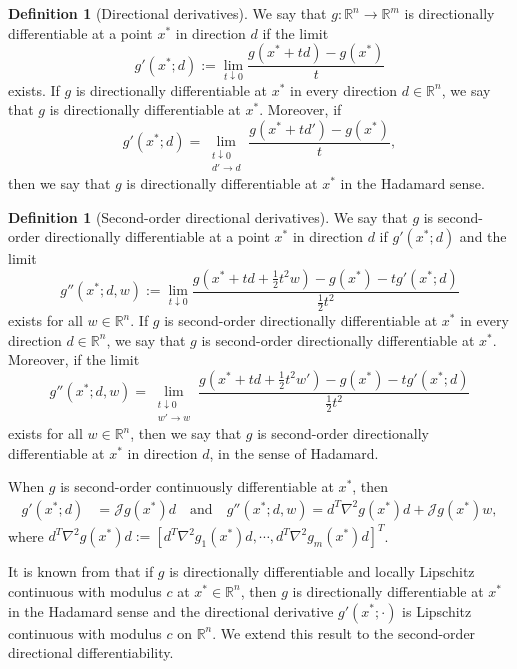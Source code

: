 \documentclass[11pt]{article}
\theoremstyle{definition}
\newtheorem{definition}[theorem]{Definition}
\theoremstyle{remark}
\numberwithin{equation}{section}
\begin{document}
\begin{definition}[Directional derivatives]
   We say that $g:\mathbb{R}^n\to \mathbb{R}^m$ is directionally differentiable at a point $x^*$ in
direction $d$ if the limit
$$g'(x^*;d):=\lim_{t\downarrow 0}\frac{g(x^*+td)-g(x^*)}{t}$$
exists. If $g$ is directionally differentiable at $x^*$ in every direction $d\in\mathbb{R}^n $, we say that
$g$ is directionally differentiable at $x^*$. Moreover, if
$$g'(x^*;d)=\lim_{\substack{t\downarrow 0\\ d'\to d}}\frac{g(x^*+td')-g(x^*)}{t},$$
then we say that $g$ is directionally differentiable at $x^*$ in the Hadamard
sense.
\end{definition}
\begin{definition}[Second-order directional derivatives]\label{2-der}
  We say that $g$ is second-order directionally differentiable at a point $x^*$ in
direction $d$ if $g'(x^*;d)$ and the limit
$$g''(x^*;d,w):=\lim_{t\downarrow 0}\frac{g(x^*+td+\frac{1}{2}t^2w)-g(x^*)-tg'(x^*;d)}{\frac{1}{2}t^2}$$
exists for all $w\in \mathbb{R}^n$. If $g$ is second-order directionally differentiable at $x^*$ in every direction
$d\in\mathbb{R}^n $, we say that
$g$ is second-order directionally differentiable at $x^*$.
Moreover, if the limit
$$g''(x^*;d,w)=\lim_{\substack{t\downarrow 0\\ w'\to
w}}\frac{g(x^*+td+\frac{1}{2}t^2w')-g(x^*)-tg'(x^*;d)}{\frac{1}{2}t^2}$$
exists for all $w\in \mathbb{R}^n$,
then we say that $g$ is second-order directionally differentiable at $x^*$ in
direction $d$, in the sense of Hadamard.
\end{definition}
When $g$ is second-order continuously differentiable at $x^*$, then
\begin{align}\label{C2 g'= g''=}
  g'(x^*;d)&=\mathcal{J}g(x^*)d \quad\text{and}\quad
  g''(x^*;d,w)=d^T\nabla^2g(x^*)d+\mathcal{J}g(x^*)w,
\end{align}
where $d^T\nabla^2g(x^*)d:=\left[d^T\nabla^2g_1(x^*)d,\cdots,d^T\nabla^2g_m(x^*)d\right]^T$.


 It is known from \cite[Proposition 2.49]{Bonnans} that if $g$ is directionally differentiable and locally Lipschitz continuous with  modulus $c$ at $x^*\in\mathbb{R}^n$, then $g$ is directionally
differentiable at $x^*$ in the Hadamard sense and the directional derivative $g'(x^*;\cdot)$ is
Lipschitz continuous with modulus $c$ on $\mathbb{R}^n$.
We extend this result to the second-order directional differentiability.
\end{document}
